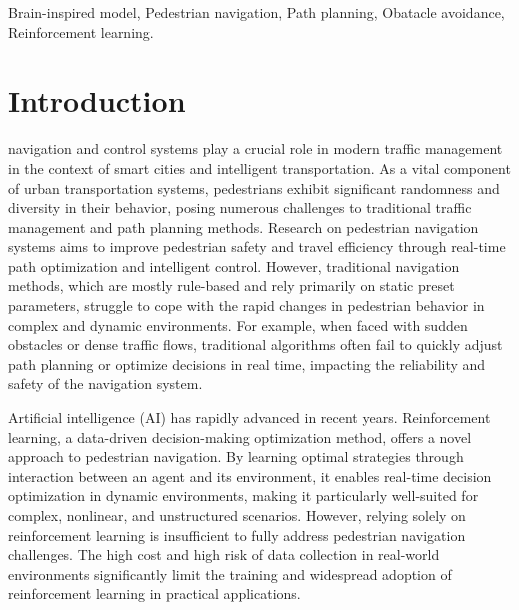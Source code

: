 \documentclass[lettersize,journal]{IEEEtran}
\begin{document}
\begin{IEEEkeywords}
Brain-inspired model, Pedestrian navigation, Path planning, Obatacle avoidance, Reinforcement learning.
\end{IEEEkeywords}

\section{Introduction}
 navigation and control systems play a crucial role in modern traffic management in the context of smart cities and intelligent transportation. 
As a vital component of urban transportation systems, pedestrians exhibit significant randomness and diversity in their behavior, posing numerous challenges to traditional traffic management and path planning methods. 
Research on pedestrian navigation systems aims to improve pedestrian safety and travel efficiency through real-time path optimization and intelligent control. 
However, traditional navigation methods, which are mostly rule-based and rely primarily on static preset parameters, struggle to cope with the rapid changes in pedestrian behavior in complex and dynamic environments. 
For example, when faced with sudden obstacles or dense traffic flows, traditional algorithms often fail to quickly adjust path planning or optimize decisions in real time, impacting the reliability and safety of the navigation system.


Artificial intelligence (AI) has rapidly advanced in recent years. 
Reinforcement learning, a data-driven decision-making optimization method, offers a novel approach to pedestrian navigation. 
By learning optimal strategies through interaction between an agent and its environment, it enables real-time decision optimization in dynamic environments, making it particularly well-suited for complex, nonlinear, and unstructured scenarios. 
However, relying solely on reinforcement learning is insufficient to fully address pedestrian navigation challenges. 
The high cost and high risk of data collection in real-world environments significantly limit the training and widespread adoption of reinforcement learning in practical applications.
\end{document}
